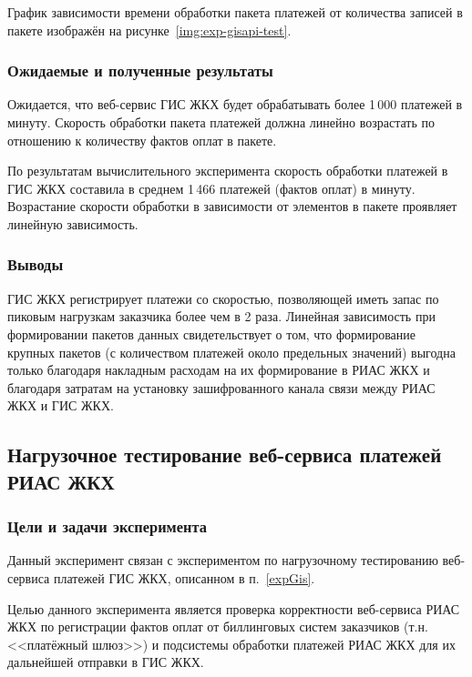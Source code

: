 График зависимости времени обработки пакета платежей от количества записей в пакете изображён на рисунке~\ref{img:exp-gisapi-test}.


\subsubsection*{Ожидаемые и полученные результаты}

Ожидается, что веб-сервис ГИС ЖКХ будет обрабатывать более 1\,000 платежей в минуту.
Скорость обработки пакета платежей должна линейно возрастать по отношению к количеству фактов оплат в пакете.

По результатам вычислительного эксперимента скорость обработки платежей в ГИС ЖКХ составила в среднем 1\,466 платежей (фактов оплат) в минуту.
Возрастание скорости обработки в зависимости от элементов в пакете проявляет линейную зависимость.

\subsubsection*{Выводы}

ГИС ЖКХ регистрирует платежи со скоростью, позволяющей иметь запас по пиковым нагрузкам заказчика более чем в 2 раза.
Линейная зависимость при формировании пакетов данных свидетельствует о том, что формирование крупных пакетов (с количеством платежей около предельных значений) выгодна только благодаря накладным расходам на их формирование в РИАС ЖКХ и благодаря затратам на установку зашифрованного канала связи между РИАС ЖКХ и ГИС ЖКХ.

\subsection{Нагрузочное тестирование веб-сервиса платежей РИАС ЖКХ}

\subsubsection*{Цели и задачи эксперимента}

Данный эксперимент связан с экспериментом по нагрузочному тестированию веб-сервиса платежей ГИС ЖКХ, описанном в п.~\ref{expGis}.

Целью данного эксперимента является проверка корректности веб-сервиса РИАС ЖКХ по регистрации фактов оплат от биллинговых систем заказчиков (т.н. <<платёжный шлюз>>) и подсистемы обработки платежей РИАС ЖКХ для их дальнейшей отправки в ГИС ЖКХ.

